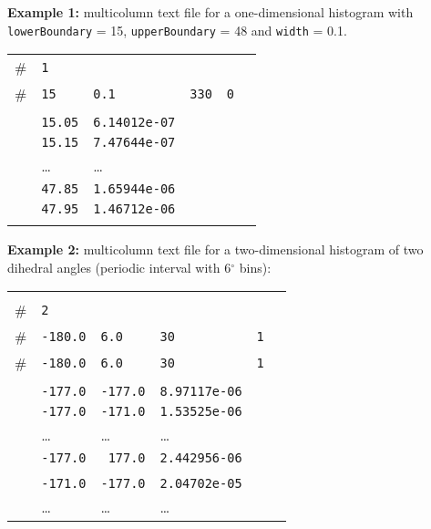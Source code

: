 \noindent\textbf{Example 1:} multicolumn text file for a one-dimensional histogram with \texttt{lowerBoundary} = 15, \texttt{upperBoundary} = 48 and \texttt{width} = 0.1.

\begin{tabular}{l l l l l l}
\\
\# & \texttt{1} & & & & \\
\# & \texttt{15} & \texttt{0.1} & \texttt{330} & \texttt{0} \\
\\
& \texttt{15.05} & \texttt{6.14012e-07} & & & \\
& \texttt{15.15} & \texttt{7.47644e-07} & & & \\
& \ldots & \ldots & & & \\
& \texttt{47.85} & \texttt{1.65944e-06} & & & \\
& \texttt{47.95} & \texttt{1.46712e-06} & & & \\
\\
\end{tabular}

\noindent\textbf{Example 2:} multicolumn text file for a two-dimensional histogram of two dihedral angles (periodic interval with 6$^\circ$ bins):

\begin{tabular}{l l l l l l}
& & & & \\
\# & \texttt{2} & & & & \\
\# & \texttt{-180.0} & \texttt{6.0} & \texttt{30} & \texttt{1} \\
\# & \texttt{-180.0} & \texttt{6.0} & \texttt{30} & \texttt{1} \\
\\
& \texttt{-177.0} & \texttt{-177.0} & \texttt{8.97117e-06} & & \\
& \texttt{-177.0} & \texttt{-171.0} & \texttt{1.53525e-06} & & \\
& \ldots & \ldots & \ldots & & \\
& \texttt{-177.0} & \texttt{ 177.0} & \texttt{2.442956-06} & & \\
\\
& \texttt{-171.0} & \texttt{-177.0} & \texttt{2.04702e-05} & & \\
& \ldots & \ldots & \ldots & & \\
\end{tabular}


